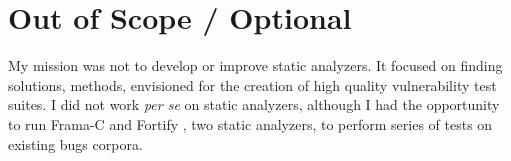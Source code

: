 \section{Out of Scope / Optional}

My mission was not to develop or improve static analyzers. It focused on finding solutions, methods, envisioned for the creation of high quality \gls{vulnerability} test suites. I did not work \emph{per se} on static analyzers, although I had the opportunity to run Frama-C \cite{frama2016c} and Fortify \cite{hewlett2016fortify}, two static analyzers, to perform series of tests on existing bugs corpora.

